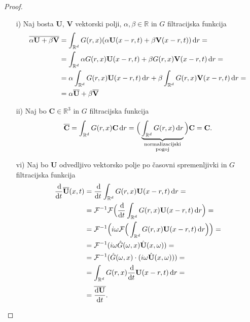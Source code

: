 \documentclass[mat2, tisk]{fmfdelo}
\newcommand{\R}{\mathbb R}
\newcommand{\bd}{\textbf}
\begin{document}
\begin{proof}
\begin{enumerate}
  \item[i)] Naj bosta $\bd{U}$, $\bd{V}$ vektorski polji, $\alpha, \beta \in \R$ in $G$ filtracijska 
  funkcija
  \begin{align*}
  \overline{\alpha \bd{U} + \beta \bd{V}} &= \int_{\R^d} G(r, x) (\alpha \bd{U}(x-r, t) + \beta \bd{V}(x-r, t)) \dif r = \\
  &= \int_{\R^d} \alpha G(r, x) \bd{U}(x-r, t) + \beta G(r, x) \bd{V}(x-r, t) \dif r = \\
  &= \alpha\int_{\R^d} G(r, x) \bd{U}(x-r, t)\dif r + \beta\int_{\R^d}G(r, x) \bd{V}(x-r, t) \dif r = \\
  &= \alpha \overline{\bd{U}} + \beta\overline{\bd{V}}
  \end{align*}
  \item[ii)] Naj bo $\bd{C}\in \R^3$ in $G$ filtracijska funkcija
  \begin{align*}
  \overline{\bd{C}} = \int_{\R^d} G(r, x) \bd{C} \dif r = \Big(\underbrace{\int_{\R^d} G(r, x)\dif r}_{\substack{\text{normalizacijski}\\\text{pogoj}}}\Big) \bd{C} = \bd{C}.
  \end{align*}
  \item[vi)] Naj bo $\bd{U}$ odvedljivo vektorsko polje po časovni spremenljivki in $G$ filtracijska funkcija 
  \begin{align*}
  \frac{\dif}{\dif t} \overline{\bd{U}}(x, t) &= \frac{\dif}{\dif t} \int_{\R^d} G(r, x) \bd{U}(x-r, t) \dif r = \\
  &= \mathcal{F}^{-1}\mathcal{F}\Big(\frac{\dif}{\dif t} \int_{\R^d} G(r, x) \bd{U}(x-r, t) \dif r\Big)= \\
  &= \mathcal{F}^{-1}\Big(i\omega \mathcal{F}\Big(\int_{\R^d} G(r, x) \bd{U}(x-r, t) \dif r \Big)\Big)= \\
  &= \mathcal{F}^{-1}(i\omega \hat{G}(\omega, x)\hat{\bd{U}}(x, \omega)) = \\
  &= \mathcal{F}^{-1}(\hat{G}(\omega, x) \cdot(i\omega \hat{\bd{U}}(x, \omega))) = \\
  &= \int_{\R^d} G(r, x) \frac{\dif}{\dif t} \bd{U}(x-r, t) \dif r =\\[1mm]
  &= \overline{\frac{\dif \bd{U}}{\dif t}}.
  \end{align*}


\end{enumerate}
\end{proof}
\end{document}
